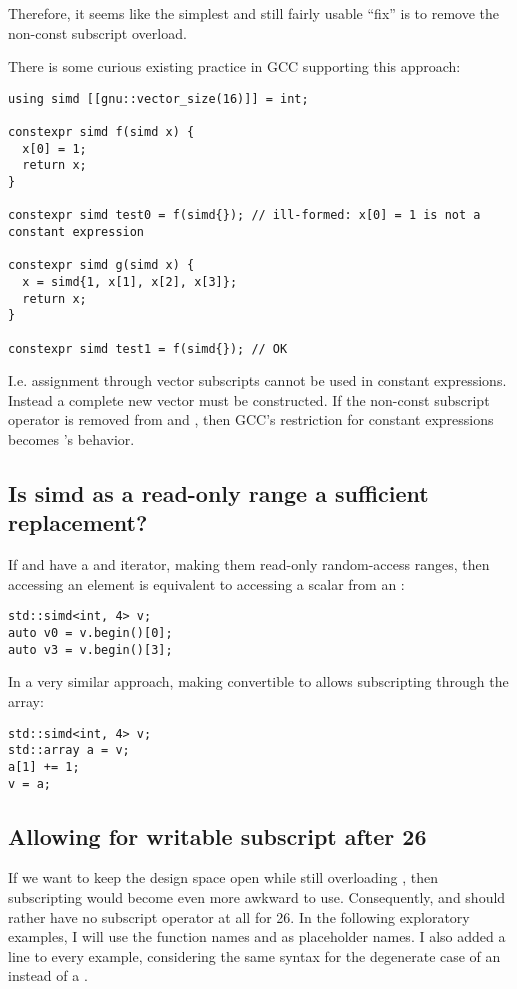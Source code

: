 Therefore, it seems like the simplest and still fairly usable “fix” is to
remove the non-const subscript overload.

There is some curious existing practice in GCC supporting this approach:
\medskip\begin{lstlisting}[style=Vc]
using simd [[gnu::vector_size(16)]] = int;

constexpr simd f(simd x) {
  x[0] = 1;
  return x;
}

constexpr simd test0 = f(simd{}); // ill-formed: x[0] = 1 is not a constant expression

constexpr simd g(simd x) {
  x = simd{1, x[1], x[2], x[3]};
  return x;
}

constexpr simd test1 = f(simd{}); // OK
\end{lstlisting}
I.e. assignment through vector subscripts cannot be used in constant expressions.
Instead a complete new vector must be constructed.
If the non-const subscript operator is removed from \simd and \mask, then GCC's
restriction for constant expressions becomes \std\simd's behavior.


\subsection{Is simd as a read-only range a sufficient replacement?}

If \simd and \mask have a  and  iterator, making
them read-only random-access ranges, then accessing an element is
equivalent to accessing a scalar from an :
\medskip\begin{lstlisting}[style=Vc]
std::simd<int, 4> v;
auto v0 = v.begin()[0];
auto v3 = v.begin()[3];
\end{lstlisting}

In a very similar approach, making \simd convertible to  allows
subscripting through the array:
\medskip\begin{lstlisting}[style=Vc]
std::simd<int, 4> v;
std::array a = v;
a[1] += 1;
v = a;
\end{lstlisting}

\subsection{Allowing for writable subscript after \CC{}26}

If we want to keep the design space open while still overloading
\simd{}, then subscripting would become even more awkward to
use.
Consequently, \simd and \mask should rather have no subscript operator at all
for \CC{}26.
In the following exploratory examples, I will use the function names 
and  as placeholder names.
I also added a line to every example, considering the same syntax for the
degenerate case of an  instead of a .

